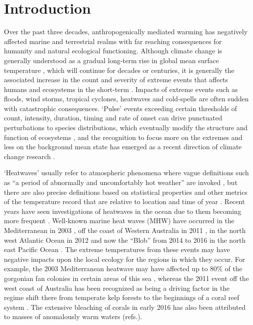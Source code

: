 \documentclass[a4paper,10pt,review]{elsarticle}
\begin{document}
\linenumbers

\section{Introduction}

Over the past three decades, anthropogenically mediated warming has negatively affected marine and terrestrial realms with far reaching consequences for humanity and natural ecological functioning. Although climate change is generally understood as a gradual long-term rise in global mean surface temperature \citep{IPCC2014}, which will continue for decades or centuries, it is generally the associated increase in the count and severity of extreme events that affects humans and ecosystems in the short-term \citep{Easterling2000}. Impacts of extreme events such as floods, wind storms, tropical cyclones, heatwaves and cold-spells are often sudden with catastrophic consequences. `Pulse' events exceeding certain thresholds of count, intensity, duration, timing and rate of onset can drive punctuated perturbations to species distributions, which eventually modify the structure and function of ecosystems \citep{Wernberg2013, Rehage2016}, and the recognition to focus more on the extremes and less on the background mean state has emerged as a recent direction of climate change research \citep{Jentsch2007}.

`Heatwaves' usually refer to atmospheric phenomena where vague definitions such as ``a period of abnormally and uncomfortably hot weather'' are invoked \citep{Glickman2000}, but there are also precise definitions based on statistical properties and other metrics of the temperature record that are relative to location and time of year \citep[e.g.][]{Meehl2004, Alexander2006, Fischer2010, Fischer2011, Perkins2013}. Recent years have seen investigations of heatwaves in the ocean due to them becoming more frequent \citep[e.g.][]{Mackenzie2007, Selig2010, Sura2011, Lima2012, DeCastro2014}. Well-known marine heat waves (MHW) have occurred in the Mediterranean in 2003 \citep{Black2004, Olita2007, Garrabou2009}, off the coast of Western Australia in 2011 \citep{Feng2013, Pearce2013, Wernberg2013}, in the north west Atlantic Ocean in 2012 \citep{Mills2012, Chen2014, Chen2015} and now the ``Blob'' from 2014 to 2016 in the north east Pacific Ocean \citep{Bond2015}. The extreme temperatures from these events may have negative impacts upon the local ecology for the regions in which they occur. For example, the 2003 Mediterranean heatwave may have affected up to 80\% of the gorgonian fan colonies in certain areas of this sea \citep{Garrabou2009}, whereas the 2011 event off the west coast of Australia has been recognized as being a driving factor in the regime shift there from temperate kelp forests to the beginnings of a coral reef system \citep{Wernberg2013}. The extensive bleaching of corals in early 2016 has also been attributed to masses of anomalously warm waters (refs.).
\end{document}
